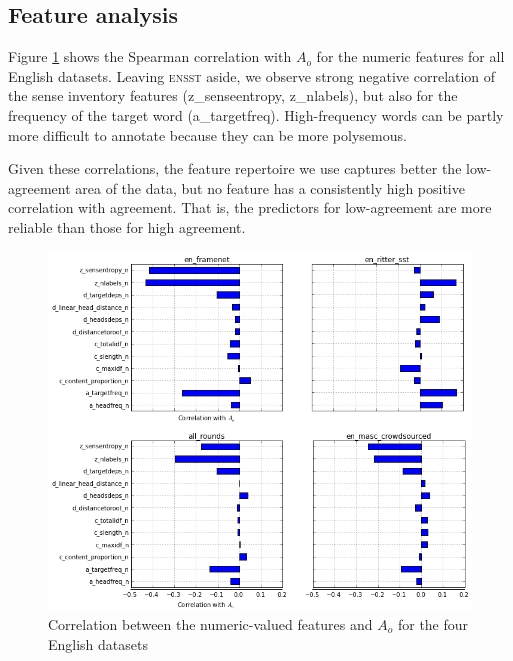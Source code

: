\documentclass[11pt,a4paper]{article}
\begin{document}
%

%
%

\subsection{Feature analysis}
Figure \ref{fig:correlations} shows the Spearman correlation with $A_o$ for the numeric features for all English datasets. Leaving \textsc{ensst} aside, we observe strong negative correlation of the sense inventory features (z\_senseentropy, z\_nlabels), but also for the frequency of the target word (a\_targetfreq). High-frequency words can be partly more difficult to annotate because they can be more polysemous. 

Given these correlations, the feature repertoire we use captures better the low-agreement area of the data, but no feature has a consistently high positive correlation with agreement. That is, the predictors for low-agreement are more reliable than those for high agreement. %
\begin{figure}[htt]
\includegraphics[scale=0.3]{corrtable.jpg}

\caption{ \label{fig:correlations}Correlation between the numeric-valued features and $A_o$ for the four English datasets}    
\end{figure}
\end{document}
